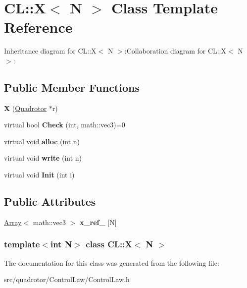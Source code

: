 \hypertarget{classCL_1_1X}{
\section{CL::X$<$ N $>$ Class Template Reference}
\label{classCL_1_1X}
}
Inheritance diagram for CL::X$<$ N $>$:Collaboration diagram for CL::X$<$ N $>$:\subsection*{Public Member Functions}
\begin{DoxyCompactItemize}
\item 
\hypertarget{classCL_1_1X_ac0df118e23cb6f9fd151c295f20b5dc7}{
{\bfseries X} (\hyperlink{classQuadrotor}{Quadrotor} $\ast$r)}
\label{classCL_1_1X_ac0df118e23cb6f9fd151c295f20b5dc7}

\item 
\hypertarget{classCL_1_1X_aa1a6d63850e96205aead2cf514646b82}{
virtual bool {\bfseries Check} (int, math::vec3)=0}
\label{classCL_1_1X_aa1a6d63850e96205aead2cf514646b82}

\item 
\hypertarget{classCL_1_1X_a54020da1e162b1813e86d4bf919c4da3}{
virtual void {\bfseries alloc} (int n)}
\label{classCL_1_1X_a54020da1e162b1813e86d4bf919c4da3}

\item 
\hypertarget{classCL_1_1X_a7f4029b18e5f19adb12c27aac2210977}{
virtual void {\bfseries write} (int n)}
\label{classCL_1_1X_a7f4029b18e5f19adb12c27aac2210977}

\item 
\hypertarget{classCL_1_1X_a31783ad77e8fe3aca841633c84c396b4}{
virtual void {\bfseries Init} (int i)}
\label{classCL_1_1X_a31783ad77e8fe3aca841633c84c396b4}

\end{DoxyCompactItemize}
\subsection*{Public Attributes}
\begin{DoxyCompactItemize}
\item 
\hypertarget{classCL_1_1X_ae8cca322585bd7d858fb1408ad6d1f72}{
\hyperlink{classArray}{Array}$<$ math::vec3 $>$ {\bfseries x\_\-ref\_\-} \mbox{[}N\mbox{]}}
\label{classCL_1_1X_ae8cca322585bd7d858fb1408ad6d1f72}

\end{DoxyCompactItemize}
\subsubsection*{template$<$int N$>$ class CL::X$<$ N $>$}



The documentation for this class was generated from the following file:\begin{DoxyCompactItemize}
\item 
src/quadrotor/ControlLaw/ControlLaw.h\end{DoxyCompactItemize}
